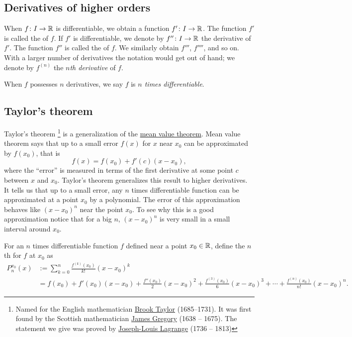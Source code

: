 
\subsection{Derivatives of higher orders}

When $f \colon I \to {\mathbb{R}}$ is differentiable, we obtain a function
$f' \colon I \to {\mathbb{R}}$.  The function
$f'$ is called the \emph{} of $f$.
If $f'$ is differentiable, we denote by
$f'' \colon I \to {\mathbb{R}}$ the derivative of $f'$.  The function $f''$
is called the \emph{} of $f$.
We similarly obtain
$f'''$, $f''''$, and so on.
With a larger number of derivatives
the notation would get out of hand; we denote
by $f^{(n)}$ the \emph{$n$th derivative} of $f$.

When $f$ possesses $n$ derivatives, we say $f$ is
\emph{$n$ times differentiable}.

\subsection{Taylor's theorem}

Taylor's theorem%
\footnote{Named for the English mathematician
\href{http://en.wikipedia.org/wiki/Brook_Taylor}{Brook Taylor}
(1685--1731).
It was first found by
the Scottish mathematician
\href{http://en.wikipedia.org/wiki/James_Gregory_(mathematician)}{James Gregory}
(1638 -- 1675).  The statement we give
was proved by
\href{http://en.wikipedia.org/wiki/Lagrange}{Joseph-Louis Lagrange}
(1736 -- 1813)}
is a generalization of the \hyperref[thm:mvt]{mean value theorem}.
Mean value theorem says that up to a small error $f(x)$ for $x$ near $x_0$ can be
approximated by $f(x_0)$, that is
\begin{equation*}
f(x) = f(x_0) + f'(c)(x-x_0),
\end{equation*}
where the ``error'' is measured in terms of the first derivative
at some point $c$ between $x$ and $x_0$.
Taylor's theorem generalizes this result to higher derivatives.
It tells us that up to a small error, any $n$
times differentiable function can be approximated at a point $x_0$
by a polynomial.  The
error of this approximation behaves like ${(x-x_0)}^{n}$ near the point $x_0$.
To see why this is a good approximation notice that for a big $n$, 
${(x-x_0)}^n$ is very small in a small interval around $x_0$.

\begin{defn}
For an $n$ times differentiable function $f$ defined near a point $x_0 \in {\mathbb{R}}$, define the
$n$th \emph{}%
for $f$ at $x_0$ as
\begin{equation*}
\begin{split}
P_n^{x_0}(x)
& :=
\sum_{k=0}^n
\frac{f^{(k)}(x_0)}{k!}{(x-x_0)}^k
\\
& =
f(x_0)
+ f'(x_0)(x-x_0)
+ \frac{f''(x_0)}{2}{(x-x_0)}^2
+ \frac{f^{(3)}(x_0)}{6}{(x-x_0)}^3
+ \cdots
+ \frac{f^{(n)}(x_0)}{n!}{(x-x_0)}^n .
\end{split}
\end{equation*}
\end{defn}

